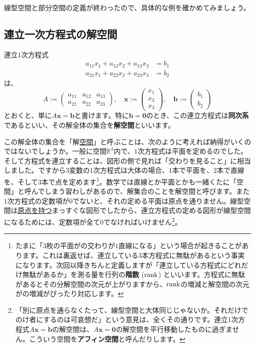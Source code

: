線型空間と部分空間の定義が終わったので、具体的な例を確かめてみましょう。

\subsection{連立一次方程式の解空間}

連立$1$次方程式
\begin{align*}
a_{11} x_1 + a_{12} x_2 + a_{13} x_3 &= b_1 \\
a_{21} x_1 + a_{22} x_2 + a_{23} x_3 &= b_2
\end{align*}
は、
\[
A :=
\begin{pmatrix}
a_{11} & a_{12} & a_{13} \\
a_{21} & a_{22} & a_{23}
\end{pmatrix}, \quad
\bm{x} :=
\begin{pmatrix}
x_1 \\
x_2 \\
x_3
\end{pmatrix}, \quad
\bm{b} := 
\begin{pmatrix}
b_1 \\
b_2
\end{pmatrix}
\]
とおくと、単に$A\bm{x} = \bm{b}$と書けます。特に$\bm{b} = \bm{0}$のとき、この連立方程式は\textbf{同次系}であるといい、その解全体の集合を\textbf{解空間}といいます。

この解全体の集合を「解\uline{空間}」と呼ぶことは、次のように考えれば納得がいくのではないでしょうか。一般に空間$\mathbb{R}^3$内で、$1$次方程式は平面を定めるのでした。そして方程式を連立することは、図形の側で見れば「交わりを見ること」に相当しました。ですから$3$変数の$1$次方程式は大体の場合、$1$本で平面を、$2$本で直線を、そして$3$本で点を定めます\footnote{たまに「$3$枚の平面がの交わりが$1$直線になる」という場合が起きることがあります。これは裏返せば、連立している$3$本方程式に無駄があるという事実になります。次回以降きちんと定義しますが「連立している方程式にどれだけ無駄があるか」を測る量を行列の\textbf{階数} ($\operatorname{rank}$) といいます。方程式に無駄があるとその分解空間の次元が上がりますから、$\operatorname{rank}$の増減と解空間の次元がの増減がぴったり対応します。}。数学では直線とか平面とかも一緒くたに「空間」と呼んでしまう習わしがあるので、解集合のことを解空間と呼びます。また$1$次方程式の定数項が$0$でないと、それの定める平面は原点を通りません。線型空間は\uline{原点を持つ}まっすぐな図形でしたから、連立方程式の定める図形が線型空間になるためには、定数項が全て$0$でなければいけません\footnote{「別に原点を通らなくたって、線型空間と大体同じじゃないか。それだけでのけ者にするのは可哀想だ」という意見は、全くその通りです。連立$1$次方程式$A\bm{x} = \bm{b}$の解空間は、$A\bm{x} = \bm{0}$の解空間を平行移動したものに過ぎません。こういう空間を\textbf{アフィン空間}と呼んだりします。}。

